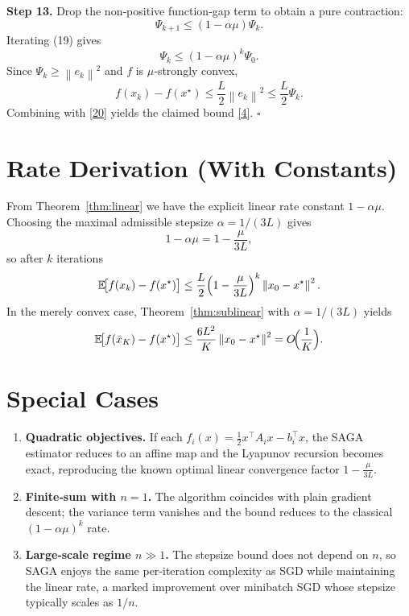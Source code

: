 \documentclass[12pt]{article}
\newcommand{\E}{\mathbb{E}}
\newcommand{\norm}[1]{\left\| #1\right\|}
\begin{document}
\noindent\textbf{Step 13.} Drop the non‑positive function‑gap term to obtain a pure contraction:
\[
\Psi_{k+1}\le (1-\alpha\mu)\Psi_{k}.
\tag{19}
\]
Iterating (19) gives
\[
\Psi_{k}\le (1-\alpha\mu)^{k}\Psi_{0}.
\tag{20}
\]
Since $\Psi_{k}\ge \norm{e_k}^{2}$ and $f$ is $\mu$‑strongly convex,
\[
f(x_k)-f(x^{\star})\le \frac{L}{2}\norm{e_k}^{2}\le \frac{L}{2}\Psi_{k}.
\]
Combining with \eqref{20} yields the claimed bound \eqref{4}.
\hfill $\square$

\section*{Rate Derivation (With Constants)}
From Theorem~\ref{thm:linear} we have the explicit linear rate constant $1-\alpha\mu$.  
Choosing the maximal admissible stepsize $\alpha=1/(3L)$ gives
\[
1-\alpha\mu=1-\frac{\mu}{3L},
\]
so after $k$ iterations
\[
\E\!\bigl[f(x_k)-f(x^{\star})\bigr]
\le \frac{L}{2}\Bigl(1-\frac{\mu}{3L}\Bigr)^{k}\norm{x_0-x^{\star}}^{2}.
\]
In the merely convex case, Theorem~\ref{thm:sublinear} with $\alpha=1/(3L)$ yields
\[
\E\!\bigl[f(\bar x_K)-f(x^{\star})\bigr]
\le \frac{6L^{2}}{K}\norm{x_0-x^{\star}}^{2}=O\!\Bigl(\frac{1}{K}\Bigr).
\]

\section*{Special Cases}
\begin{enumerate}
\item \textbf{Quadratic objectives.} If each $f_i(x)=\frac12 x^{\top} A_i x-b_i^{\top}x$, the SAGA estimator reduces to an affine map and the Lyapunov recursion becomes exact, reproducing the known optimal linear convergence factor $1-\frac{\mu}{3L}$.
\item \textbf{Finite‑sum with $n=1$.} The algorithm coincides with plain gradient descent; the variance term vanishes and the bound reduces to the classical $ (1-\alpha\mu)^{k}$ rate.
\item \textbf{Large‑scale regime $n\gg 1$.} The stepsize bound does not depend on $n$, so SAGA enjoys the same per‑iteration complexity as SGD while maintaining the linear rate, a marked improvement over minibatch SGD whose stepsize typically scales as $1/n$.
\end{enumerate}
\end{document}
